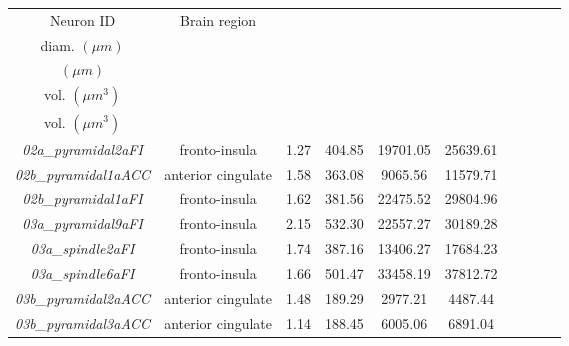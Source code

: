 \begin{longtable}{|c|c|c|c|c|c|c|c|c|c|} \hline
	Neuron ID                     & Brain region       & \begin{tabular}[c]{@{}c@{}}Average\\ diam. $(\mu m)$\end{tabular} & \begin{tabular}[c]{@{}c@{}} Height\\ $(\mu m)$\end{tabular} & \begin{tabular}[c]{@{}c@{}}Soma\\ vol. $(\mu m^3)$\end{tabular} & \begin{tabular}[c]{@{}c@{}}Total\\ vol. $(\mu m^3)$\end{tabular} \\ \hline
	\textit{02a\_pyramidal2aFI}   & fronto-insula      & 1.27                      & 404.85                    & 19701.05                  & 25639.61                  \\ \hline
	\textit{02b\_pyramidal1aACC}  & anterior cingulate & 1.58                      & 363.08                    & 9065.56                   & 11579.71                  \\ \hline
	\textit{02b\_pyramidal1aFI}   & fronto-insula      & 1.62                      & 381.56                    & 22475.52                  & 29804.96                  \\ \hline
	\textit{03a\_pyramidal9aFI}   & fronto-insula      & 2.15                      & 532.30                    & 22557.27                  & 30189.28                  \\ \hline
	\textit{03a\_spindle2aFI}     & fronto-insula      & 1.74                      & 387.16                    & 13406.27                  & 17684.23                  \\ \hline
	\textit{03a\_spindle6aFI}     & fronto-insula      & 1.66                      & 501.47                    & 33458.19                  & 37812.72                  \\ \hline
	\textit{03b\_pyramidal2aACC}  & anterior cingulate & 1.48                      & 189.29                    & 2977.21                   & 4487.44                   \\ \hline
	\textit{03b\_pyramidal3aACC}  & anterior cingulate & 1.14                      & 188.45                    & 6005.06                   & 6891.04                   \\ \hline

\end{longtable}
